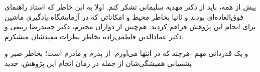 


\begin{center}
\end{center}
پیش از همه، باید از دکتر مهدیه سلیمانی تشکر کنم. اولا به این خاطر که استاد راهنمای فوق‌العاده‌ای بودند و ثانیا بخاطر محیط و امکاناتی که در آزمایشگاه یادگیری ماشین برای انجام این پژوهش فراهم کردند.
هم‌چنین از دواران محترم، دکتر حمیدرضا ربیعی و دکتر عمادالدین فاطمی‌زاده بخاطر نظرات مفیدشان متشکرم.

و یک قدردانی مهم  -هرچند که در انتها می‌آورم- از پدرم و مادرم است؛ بخاطر صبر و پشتیبانی همیشگی‌شان از جمله در زمان انجام این پژوهش.
‌جدید
